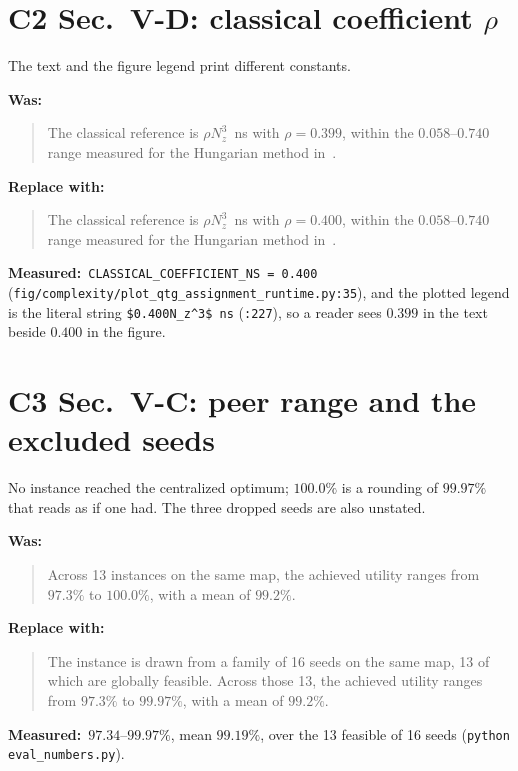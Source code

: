 \documentclass[10pt]{article}
\newcommand{\Was}{\par\smallskip\noindent\textbf{\textcolor{red!70!black}{Was:}}\par\nopagebreak}
\newcommand{\Now}{\par\smallskip\noindent\textbf{\textcolor{green!35!black}{Replace with:}}\par\nopagebreak}
\newcommand{\Why}{\par\smallskip\noindent\textbf{Measured:}\ }
\begin{document}
\section*{C2 \quad Sec.~V-D: classical coefficient $\rho$}

The text and the figure legend print different constants.

\Was
\begin{quote}
The classical reference is $\rho N_z^3$~ns with $\rho=0.399$, within the
$0.058$--$0.740$ range measured for the Hungarian method \cite{kuhn1955}
in~\cite{jang2025cqf}.
\end{quote}

\Now
\begin{quote}
The classical reference is $\rho N_z^3$~ns with $\rho=0.400$, within the
$0.058$--$0.740$ range measured for the Hungarian method \cite{kuhn1955}
in~\cite{jang2025cqf}.
\end{quote}

\Why \texttt{CLASSICAL\_COEFFICIENT\_NS = 0.400}
(\texttt{fig/complexity/plot\_qtg\_assignment\_runtime.py:35}), and the
plotted legend is the literal string \verb|$0.400N_z^3$ ns| (\texttt{:227}),
so a reader sees $0.399$ in the text beside $0.400$ in the figure.

\section*{C3 \quad Sec.~V-C: peer range and the excluded seeds}

No instance reached the centralized optimum; $100.0\%$ is a rounding of
$99.97\%$ that reads as if one had. The three dropped seeds are also
unstated.

\Was
\begin{quote}
Across 13 instances on the same map, the achieved utility ranges from
$97.3\%$ to $100.0\%$, with a mean of $99.2\%$.
\end{quote}

\Now
\begin{quote}
The instance is drawn from a family of 16 seeds on the same map, 13 of
which are globally feasible. Across those 13, the achieved utility ranges
from $97.3\%$ to $99.97\%$, with a mean of $99.2\%$.
\end{quote}

\Why $97.34$--$99.97\%$, mean $99.19\%$, over the 13 feasible of 16 seeds
(\texttt{python eval\_numbers.py}).
\end{document}
